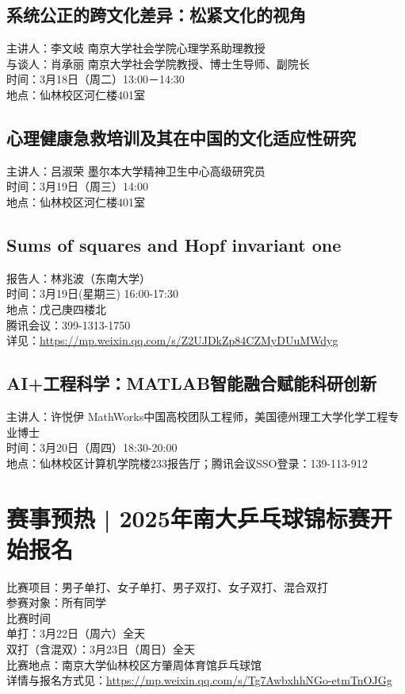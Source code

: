 \documentclass[letterpaper, 12pt]{article}
\begin{document}
\begin{multicols}{2}
\subsection{系统公正的跨文化差异：松紧文化的视角}
主讲人：李文岐 南京大学社会学院心理学系助理教授\\
与谈人：肖承丽 南京大学社会学院教授、博士生导师、副院长\\
时间：3月18日（周二）13:00－14:30\\
地点：仙林校区河仁楼401室\\

\subsection{心理健康急救培训及其在中国的文化适应性研究}
主讲人：吕淑荣 墨尔本大学精神卫生中心高级研究员\\
时间：3月19日（周三）14:00\\
地点：仙林校区河仁楼401室\\

\subsection{Sums of squares and Hopf invariant one}
报告人：林兆波（东南大学）\\
时间：3月19日(星期三) 16:00-17:30\\
地点：戊己庚四楼北\\
腾讯会议：399-1313-1750\\
详见：\url{https://mp.weixin.qq.com/s/Z2UJDkZp84CZMyDUuMWdyg}

\subsection{AI+工程科学：MATLAB智能融合赋能科研创新}
主讲人：许悦伊 MathWorks中国高校团队工程师，美国德州理工大学化学工程专业博士\\
时间：3月20日（周四）18:30-20:00\\
地点：仙林校区计算机学院楼233报告厅；腾讯会议SSO登录：139-113-912\\

\section{赛事预热 | 2025年南大乒乓球锦标赛开始报名}
比赛项目：男子单打、女子单打、男子双打、女子双打、混合双打\\
参赛对象：所有同学\\
比赛时间\\
单打：3月22日（周六）全天\\
双打（含混双）：3月23日（周日）全天\\
比赛地点：南京大学仙林校区方肇周体育馆乒乓球馆\\
详情与报名方式见：\url{https://mp.weixin.qq.com/s/Tg7AwbxhhNGo-etmTnOJGg}


\end{multicols}
\end{document}
